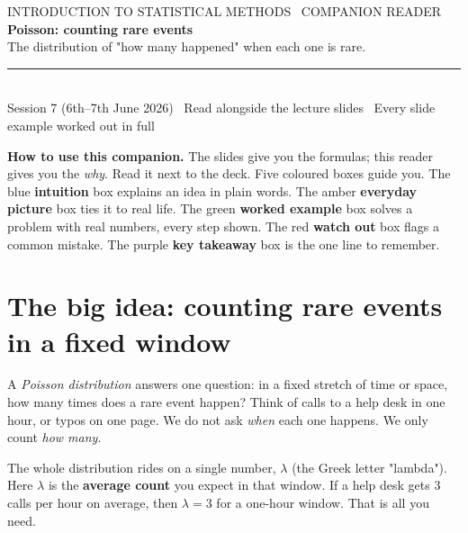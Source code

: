 \documentclass[a4paper,11pt]{article}
\begin{document}
\begin{tcolorbox}[enhanced, colback=navy, colframe=navy, boxrule=0pt,
                  arc=3pt, left=16pt, right=16pt, top=14pt, bottom=14pt,
                  coltext=white, width=\linewidth]
  {\sffamily\footnotesize\color{white!82}%
    \MakeUppercase{Introduction to Statistical Methods \textperiodcentered\ Companion Reader}}\\[8pt]
  {\sffamily\bfseries\Huge Poisson: counting rare events}\\[5pt]
  {\sffamily\large\color{white!88}%
    The distribution of "how many happened" when each one is rare.}\\[9pt]
  {\color{white!55}\rule{\linewidth}{0.4pt}}\\[6pt]
  {\sffamily\footnotesize\color{white!88}%
    Session 7 (6th--7th June 2026) \textperiodcentered\ Read alongside the lecture
    slides \textperiodcentered\ Every slide example worked out in full}
\end{tcolorbox}

\medskip
\noindent\textbf{How to use this companion.}
The slides give you the formulas; this reader gives you the \emph{why}. Read it
next to the deck. Five coloured boxes guide you. The blue
\textbf{\textcolor{cIntu}{intuition}} box explains an idea in plain words. The
amber \textbf{\textcolor{cEvery}{everyday picture}} box ties it to real life. The
green \textbf{\textcolor{cWork}{worked example}} box solves a problem with real
numbers, every step shown. The red \textbf{\textcolor{cWatch}{watch out}} box flags
a common mistake. The purple \textbf{\textcolor{cKey}{key takeaway}} box is the
one line to remember.

\section{The big idea: counting rare events in a fixed window}

A \emph{Poisson distribution} answers one question: in a fixed stretch of time
or space, how many times does a rare event happen? Think of calls to a help
desk in one hour, or typos on one page. We do not ask \emph{when} each one
happens. We only count \emph{how many}.

The whole distribution rides on a single number, $\lambda$ (the Greek letter
"lambda"). Here $\lambda$ is the \textbf{average count} you expect in that
window. If a help desk gets $3$ calls per hour on average, then $\lambda = 3$
for a one-hour window. That is all you need.
\end{document}
